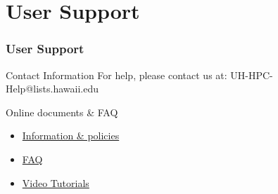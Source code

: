 \section{User Support}
\begin{frame}
  \frametitle{User Support}
  \begin{block}{Contact Information}
   For help, please contact us at: UH-HPC-Help@lists.hawaii.edu
  \end{block}
  \begin{block}{Online documents \& FAQ}
		\begin{itemize}
		\item \href{http://datascience.hawaii.edu/hpc/}{Information \& policies}
		\item \href{http://go.hawaii.edu/jdG}{FAQ}
		\item \href{http://go.hawaii.edu/3A8}{Video Tutorials}
		\end{itemize}
  \end{block}
\end{frame}

